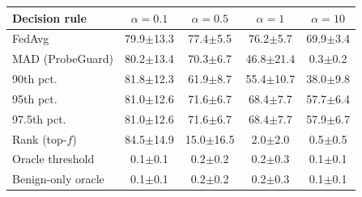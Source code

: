 \begin{tabular}{@{}lcccc@{}}
\toprule
Decision rule & $\alpha{=}0.1$ & $\alpha{=}0.5$ & $\alpha{=}1$ & $\alpha{=}10$\\
\midrule
FedAvg & 79.9$\pm$13.3 & 77.4$\pm$5.5 & 76.2$\pm$5.7 & 69.9$\pm$3.4\\
MAD (ProbeGuard) & 80.2$\pm$13.4 & 70.3$\pm$6.7 & 46.8$\pm$21.4 & 0.3$\pm$0.2\\
90th pct. & 81.8$\pm$12.3 & 61.9$\pm$8.7 & 55.4$\pm$10.7 & 38.0$\pm$9.8\\
95th pct. & 81.0$\pm$12.6 & 71.6$\pm$6.7 & 68.4$\pm$7.7 & 57.7$\pm$6.4\\
97.5th pct. & 81.0$\pm$12.6 & 71.6$\pm$6.7 & 68.4$\pm$7.7 & 57.9$\pm$6.7\\
Rank (top-$f$) & 84.5$\pm$14.9 & 15.0$\pm$16.5 & 2.0$\pm$2.0 & 0.5$\pm$0.5\\
Oracle threshold & 0.1$\pm$0.1 & 0.2$\pm$0.2 & 0.2$\pm$0.3 & 0.1$\pm$0.1\\
Benign-only oracle & 0.1$\pm$0.1 & 0.2$\pm$0.2 & 0.2$\pm$0.3 & 0.1$\pm$0.1\\
\bottomrule
\end{tabular}